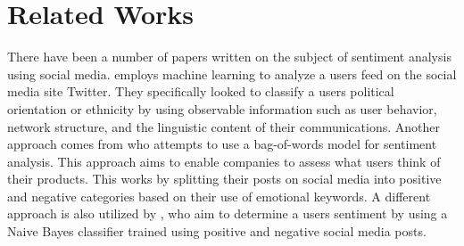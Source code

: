 \newpage\section{Related Works}
There have been a number of papers written on the subject of sentiment analysis
using social media. \citep{pennacchiotti2011machine} employs machine learning
to analyze a users feed on the social media site Twitter. They specifically
looked to classify a users political orientation or ethnicity by using
observable information such as user behavior, network structure, and the linguistic content
of their communications. Another approach comes from \citep{sarlan2014twitter}
who attempts to use a bag-of-words model for sentiment analysis. This approach
aims to enable companies to assess what users think of their products. This
works by splitting their posts on social media into positive and negative
categories based on their use of emotional keywords. A different approach is
also utilized by \citep{go2009twitter}, who aim to determine a users sentiment
by using a Naive Bayes classifier trained using positive and negative social
media posts. 